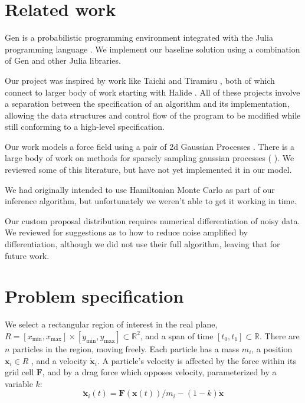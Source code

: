 \documentclass[11pt]{article}
\newcommand{\xv}[0]{\mathbf{x}}
\newcommand{\Fv}[0]{\mathbf{F}}
\begin{document}
\section{Related work}
\label{sec:org937c34a}
Gen \citep{GenPaper} is a probabilistic programming environment integrated with the Julia programming language \citep{Julia}. We implement our baseline solution using a combination of Gen and other Julia libraries.

Our project was inspired by work like Taichi \citep{Taichi} and Tiramisu \citep{Tiramisu}, both of which connect to larger body of work starting with Halide \citep{Halide}. All of these projects involve a separation between the specification of an algorithm and its implementation, allowing the data structures and control flow of the program to be modified while still conforming to a high-level specification.

Our work models a force field using a pair of 2d Gaussian Processes \citep{GPs}. There is a large body of work on methods for sparsely sampling gaussian processes (\cite{UnderstandingSparseGP} \cite{SparseSpectrumGP} \cite{UnifyingGP}). We reviewed some of this literature, but have not yet implemented it in our model.

We had originally intended to use Hamiltonian Monte Carlo \citep{HMC} as part of our inference algorithm, but unfortunately we weren't able to get it working in time.

Our custom proposal distribution requires numerical differentiation of noisy data. We reviewed \cite{NumDiffNonsmooth} for suggestions as to how to reduce noise amplified by differentiation, although we did not use their full algorithm, leaving that for future work.

\section{Problem specification}
\label{sec:orgd895d89}
We select a rectangular region of interest in the real plane, \(R = [x_{\min}, x_{\max}] \times [y_{\min}, y_{\max}] \subset \mathbb{R}^2\), and a span of time \([t_0, t_1] \subset \mathbb{R}\). There are \(n\) particles in the region, moving freely. Each particle has a mass \(m_i\), a position \(\xv_i \in R\) , and a velocity \(\dot{\xv}_i\). A particle's velocity is affected by the force within its grid cell \(\Fv\), and by a drag force which opposes velocity, parameterized by a variable \(k\):
$$\ddot{\xv}_i(t) = \Fv(\xv(t))/m_i - (1-k)\dot{\xv}$$
\end{document}
